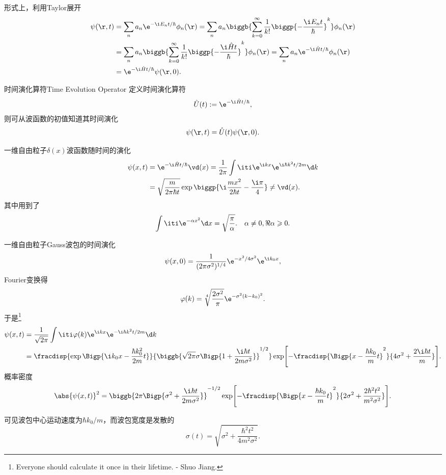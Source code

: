 形式上，利用Taylor展开
\begin{align*}
	\psi(\r,t) & =\sum_na_n\e^{-\i E_nt/\hbar}\phi_n(\r)=\sum_na_n\biggb{\sum_{k=0}^\infty\frac1{k!}\biggp{-\frac{\i E_nt}\hbar}^k}\phi_n(\r)     \\
	           & =\sum_na_n\biggb{\sum_{k=0}^\infty\frac1{k!}\biggp{-\frac{\i\hat Ht}\hbar}^k}\phi_n(\r)=\sum_na_n\e^{-\i\hat Ht/\hbar}\phi_n(\r) \\
	           & =\e^{-\i\hat Ht/\hbar}\psi(\r,0).
\end{align*}
\begin{definition}{时间演化算符}{Time Evolution Operator}
	定义时间演化算符
	\begin{align}
		\hat U(t):=\e^{-\i\hat Ht/\hbar},
	\end{align}
	则可从波函数的初值知道其时间演化
	\[
		\psi(\r,t)=\hat U(t)\psi(\r,0).
\]
\end{definition}
\begin{example}
	{一维自由粒子$\delta(x)$波函数随时间的演化}{}
	\begin{equation*}
		\begin{aligned}
			\psi(x,t) & =\e^{-\i\hat Ht/\hbar}\vd(x)=\frac1{2\pi}\int\iti\e^{\i kx}\e^{\i\hbar k^2t/2m}\d k      \\
			          & =\sqrt{\frac m{2\pi\hbar t}}\exp\biggp{\i\frac{mx^2}{2\hbar t}-\frac{\i\pi}4}\neq\vd(x).
		\end{aligned}
	\end{equation*}
	其中用到了
	\begin{align}
		\int\iti\e^{-\alpha x^2}\d x=\sqrt{\frac\pi\alpha}.\quad\alpha\neq 0,\Re\alpha\geqslant 0.
	\end{align}
\end{example}
\begin{example}
	{一维自由粒子Gauss波包的时间演化}{}
	\[
		\psi(x,0)=\frac1{(2\pi\sigma^2)^{1/4}}\e^{-x^2/4\sigma^2}\e^{\i k_0x},
	\]
	Fourier变换得
	\[
		\varphi(k)=\sqrt[4]{\frac{2\sigma^2}{\pi}}\e^{-\sigma^2(k-k_0)^2}.
	\]%
	于是\footnote{Everyone should calculate it once in their lifetime. - Shuo Jiang.}
	\begin{align*}
		\psi(x,t) & =\frac1{\sqrt{2\pi}}\int\iti\varphi(k)\e^{\i kx}\e^{-\i\hbar k^2t/2m}\d k                                                                                                                            \\
		          & =\fracdisp{\exp\Bigp{\i k_0x-\frac{\hbar k_0^2}{2m}t}}{\biggb{\sqrt{2\pi}\sigma\Bigp{1+\frac{\i\hbar t}{2m\sigma^2}}}^{1/2}}\exp\Biggl[-\fracdisp{\Bigp{x-\frac{\hbar k_0}mt}^2}{4\sigma^2+\frac{2\i\hbar t}m}\Biggr].
	\end{align*}
	概率密度
	\begin{align*}
		\abs{\psi(x,t)}^2=\biggb{2\pi\Bigp{\sigma^2+\frac{\i\hbar t}{2m\sigma^2}}}^{-1/2}\exp\Biggl[-\fracdisp{\Bigp{x-\frac{\hbar k_0}mt}^2}{2\sigma^2+\frac{2\hbar^2 t^2}{m^2\sigma^2}}\Biggr].
	\end{align*}
	
	可见波包中心运动速度为$\hbar k_0/m$，而波包宽度是发散的
	\[
		\sigma(t)=\sqrt{\sigma^2+\frac{\hbar^2t^2}{4m^2\sigma^2}}.
	\]
\end{example}
